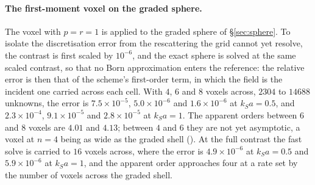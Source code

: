 \documentclass[11pt,a4paper]{article}
\begin{document}
\paragraph{The first-moment voxel on the graded sphere.} The voxel with $p=r=1$ is applied to the graded
sphere of \S\ref{sec:sphere}. To isolate the discretisation error from the rescattering the grid cannot
yet resolve, the contrast is first scaled by $10^{-6}$, and the exact sphere is solved at the same scaled
contrast, so that no Born approximation enters the reference: the relative error is then that of the
scheme's first-order term, in which the field is the incident one carried across each cell. With $4$, $6$
and $8$ voxels across, $2304$ to $14688$ unknowns, the error is $7.5\times10^{-5}$, $5.0\times10^{-6}$ and
$1.6\times10^{-6}$ at $k_Sa=0.5$, and $2.3\times10^{-4}$, $9.1\times10^{-5}$ and $2.8\times10^{-5}$ at
$k_Sa=1$. The apparent orders between $6$ and $8$ voxels are $4.01$ and $4.13$; between $4$ and $6$ they
are not yet asymptotic, a voxel at $n=4$ being as wide as the graded shell
(). At the full contrast the fast solve is carried to
$16$ voxels across, where the error is $4.9\times10^{-6}$ at $k_Sa=0.5$ and $5.9\times10^{-6}$ at
$k_Sa=1$, and the apparent order approaches four at a rate set by the number of voxels across the graded
shell.
\end{document}
